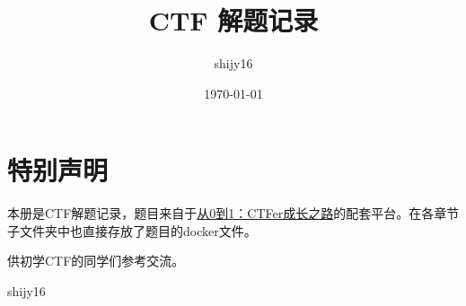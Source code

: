 \documentclass[cn,11pt,chinese]{elegantbook}
\title{CTF 解题记录}
\author{shijy16}
\date{\today}
\begin{document}
\maketitle

\chapter*{特别声明}

本册是CTF解题记录，题目来自于\href{https://book.nu1l.com/}{从0到1：CTFer成长之路}的配套平台。在各章节子文件夹中也直接存放了题目的docker文件。

供初学CTF的同学们参考交流。

\vskip 1.5cm

\begin{flushright}
shijy16
\end{flushright}


\tableofcontents
\setcounter{page}{1}


\end{document}
